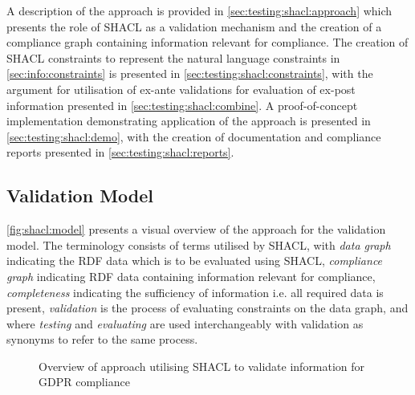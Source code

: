 A description of the approach is provided in \autoref{sec:testing:shacl:approach} which presents the role of SHACL as a validation mechanism and the creation of a compliance graph containing information relevant for compliance. The creation of SHACL constraints to represent the natural language constraints in \autoref{sec:info:constraints} is presented in \autoref{sec:testing:shacl:constraints}, with the argument for utilisation of ex-ante validations for evaluation of ex-post information presented in \autoref{sec:testing:shacl:combine}.
A proof-of-concept implementation demonstrating application of the approach is presented in \autoref{sec:testing:shacl:demo}, with the creation of documentation and compliance reports presented in \autoref{sec:testing:shacl:reports}.

\subsection{Validation Model}\label{sec:testing:shacl:approach}
\autoref{fig:shacl:model} presents a visual overview of the approach for the validation model.
The terminology consists of terms utilised by SHACL, with \textit{data graph} indicating the RDF data which is to be evaluated using SHACL, \textit{compliance graph} indicating RDF data containing information relevant for compliance, \textit{completeness} indicating the sufficiency of information i.e. all required data is present, \textit{validation} is the process of evaluating constraints on the data graph, and where \textit{testing} and \textit{evaluating} are used interchangeably with validation as synonyms to refer to the same process.
\begin{figure}[htbp]
    \centering
    \caption{Overview of approach utilising SHACL to validate information for GDPR compliance}
    \label{fig:shacl:model}
\end{figure}


